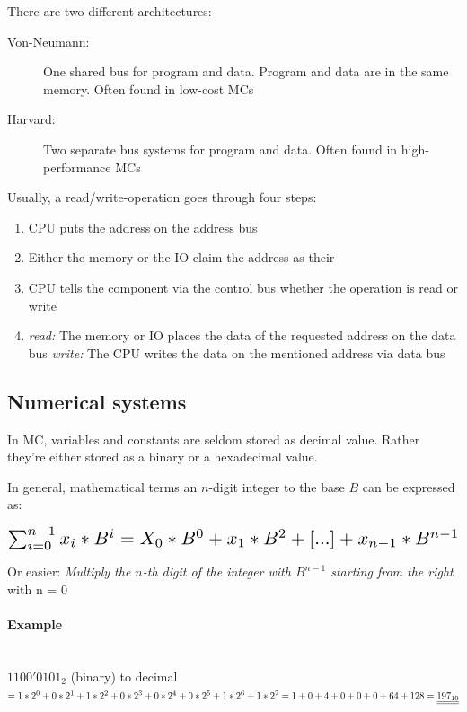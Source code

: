 \documentclass[a4paper, 11pt, nofootinbib]{article}
\begin{document}
\noindent There are two different architectures:

\begin{description}
	\item[Von-Neumann: ] One shared bus for program and data. Program and data are in the same memory. Often found in low-cost MCs
	\item[Harvard: ] Two separate bus systems for program and data. Often found in high-performance MCs
\end{description}
\vspace{10px}

\noindent Usually, a read/write-operation goes through four steps:

\begin{enumerate}
	\item CPU puts the address on the address bus
	\item Either the memory or the IO claim the address as their
	\item CPU tells the component via the control bus whether the operation is read or write
	\item 
		\subitem \textit{read: } The memory or IO places the data of the requested address on the data bus
		\subitem \textit{write: } The CPU writes the data on the mentioned address via data bus
\end{enumerate}

\subsection{Numerical systems}
In MC, variables and constants are seldom stored as decimal value. Rather they're either stored as a binary or a hexadecimal value. 

In general, mathematical terms an $n$-digit integer to the base $B$ can be expressed as:

\[ \scalebox{1.5}{$ \sum_{i=0}^{n-1} x_{i} * B^i = X_{0} * B^0 + x_{1} * B^2 + [...] + x_{n-1} * B^{n-1} $} \]

\noindent Or easier: \textit{Multiply the $n$-th digit of the integer with $B^{n-1}$ starting from the right} with n = 0

\paragraph{Example}\mbox{}\\

\noindent $1100'0101_{2}$ (binary) to decimal \\
$
	= 1*2^0 + 0*2^1 + 1*2^2 + 0*2^3 + 0*2^4 + 0*2^5 + 1*2^6 + 1*2^7 \\
	=   1   +   0   +   4   +   0   +   0   +  0   +   64   +  128 \\
	=   \underline{\underline{197_{10}}}
$
\end{document}
